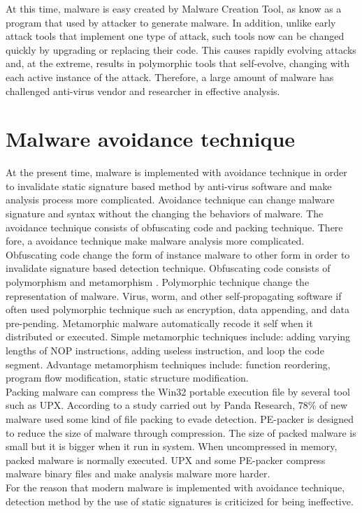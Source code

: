 \newline
At this time, malware is easy created by Malware Creation Tool, as know as a program that used by attacker to generate malware\cite{Microsoft}. In addition, unlike early attack tools that implement one type of attack, such tools now can be changed quickly by upgrading or replacing their code. This causes rapidly evolving attacks and, at the extreme, results in polymorphic tools that self-evolve, changing with each active instance of the attack. Therefore, a large amount of malware has challenged anti-virus vendor and researcher in effective analysis.

\section{Malware avoidance technique}
At the present time, malware is implemented with avoidance technique in order to invalidate static signature based method by anti-virus software and make analysis process more complicated. Avoidance technique can change malware signature and syntax without the changing the behaviors of malware. The avoidance technique consists of obfuscating code and packing technique. There fore, a avoidance technique make malware analysis more complicated. \\
 
Obfuscating code change the form of instance malware to other form in order to invalidate signature based detection technique. Obfuscating code consists of polymorphism and metamorphism \cite{blackhat1}. Polymorphic technique change the representation of malware. Virus, worm, and other self-propagating software if often used polymorphic technique such as encryption, data appending, and data pre-pending.  Metamorphic malware automatically recode it self when it distributed or executed\cite{blackhat1}. Simple metamorphic techniques include: adding varying lengths of NOP instructions, adding useless instruction, and loop the code segment. Advantage metamorphism techniques include: function reordering, program flow modification, static structure modification.\\

Packing malware can compress the Win32 portable execution file by several tool such as UPX. According to a study carried out by Panda Research, 78\% of new malware used some kind of file packing to evade detection. PE-packer is designed to reduce the size of malware through compression. The size of packed malware is small but it is bigger when it run in system\cite{packing}. When uncompressed in memory, packed malware is normally executed. UPX and some PE-packer compress malware binary files and make analysis malware more harder.\\
For the reason that modern malware is implemented with avoidance technique, detection method by the use of static signatures is criticized for being ineffective.   
